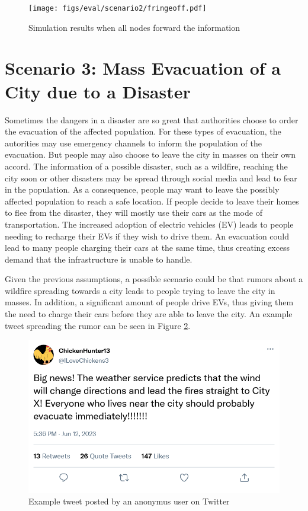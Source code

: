 \begin{figure}[!ht]
    \center
    \texttt{[image: figs/eval/scenario2/fringeoff.pdf]}
    \caption{Simulation results when all nodes forward the information}
    \label{schwurblerresults2}
\end{figure}


\section{Scenario 3: Mass Evacuation of a City due to a Disaster}
\label{scenario3all}

Sometimes the dangers in a disaster are so great that 
authorities choose to order the evacuation of the affected population.
For these types of evacuation, the autorities may use emergency channels 
to inform the population of the evacuation.
But people may also choose to leave the city in masses on their own accord.
The information of a possible disaster, such as a wildfire, reaching the
city soon or other disasters may be spread through social media and 
lead to fear in the population. As a consequence, people may 
want to leave the possibly affected population to reach a safe location.
If people decide to leave their homes to flee from the disaster, they 
will mostly use their cars as the mode of transportation.
The increased adoption of electric vehicles (EV)
leads to people needing to recharge their EVs if they wish 
to drive them. An evacuation could lead to many people charging
their cars at the same time, thus creating excess demand that 
the infrastructure is unable to handle. 

Given the previous assumptions, a possible scenario could be that 
rumors about a wildfire spreading towards a city leads to people
trying to leave the city in masses. In addition, a significant 
amount of people drive EVs, thus giving them the need to charge
their cars before they are able to leave the city. An example
tweet spreading the rumor can be seen in Figure \ref{firetweet}.


\begin{figure}[!ht]
    \center
    \includegraphics[scale=.4]{figs/firenews.png}
    \caption{Example tweet posted by an anonymus user on Twitter}
    \label{firetweet}
\end{figure}


